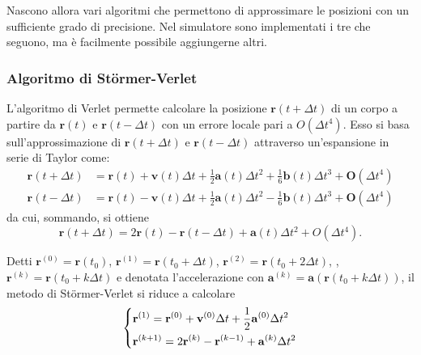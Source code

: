 \documentclass[11pt]{article}
\begin{document}
	Nascono allora vari algoritmi che permettono di approssimare le posizioni con un sufficiente grado di precisione. Nel simulatore sono implementati i tre che seguono, ma è facilmente possibile aggiungerne altri.

	\subsubsection{Algoritmo di Störmer-Verlet}

	L'algoritmo di Verlet\cite{VerletIntegration} permette calcolare la posizione $\mathbf{r}(t + \Delta t)$ di un corpo a partire da $\mathbf{r}(t)$ e $\mathbf{r}(t - \Delta t)$ con un errore locale pari a $O(\Delta t^4)$. Esso si basa sull'approssimazione di $\mathbf{r}(t + \Delta t)$ e $\mathbf{r}(t - \Delta t)$ attraverso un'espansione in serie di Taylor come:
	\begin{align}
		\mathbf{r}(t + \Delta t) &= \mathbf{r}(t) + \mathbf{v}(t)\Delta t + \frac{1}{2}\mathbf{a}(t)\Delta t^2 + \frac{1}{6}\mathbf{b}(t)\Delta t^3 + \mathbf{O}(\Delta t^4) \label{eq:verlet_a} \\
		\mathbf{r}(t - \Delta t) &= \mathbf{r}(t) - \mathbf{v}(t)\Delta t + \frac{1}{2}\mathbf{a}(t)\Delta t^2 - \frac{1}{6}\mathbf{b}(t)\Delta t^3 + \mathbf{O}(\Delta t^4) \label{eq:verlet_b}
	\end{align}
	da cui, sommando, si ottiene 
	\begin{equation*}
		\mathbf{r}(t + \Delta t) = 2\mathbf{r}(t) - \mathbf{r}(t - \Delta t) + \mathbf{a}(t)\Delta t^2 + O(\Delta t^4).
	\end{equation*}

	\begin{tcolorbox}[title=Algoritmo di Störmer-Verlet]
		Detti $\mathbf{r}^{(0)} = \mathbf{r}(t_0)$, $\mathbf{r}^{(1)} = \mathbf{r}(t_0 + \Delta t)$, $\mathbf{r}^{(2)} = \mathbf{r}(t_0 + 2\Delta t)$, \textellipsis, $\mathbf{r}^{(k)} = \mathbf{r}(t_0 + k\Delta t)$ e denotata l'accelerazione con $\mathbf{a}^{(k)} = \mathbf{a}(\mathbf{r}(t_0 + k\Delta t))$, il metodo di Störmer-Verlet si riduce a calcolare
		\begin{equation}
			\begin{dcases}
				\mathbf{r}^{(1)} = \mathbf{r}^{(0)} + \mathbf{v}^{(0)}\Delta t + \frac{1}{2}\mathbf{a}^{(0)}\Delta t^2 \\
				\mathbf{r}^{(k + 1)} = 2\mathbf{r}^{(k)} - \mathbf{r}^{(k - 1)} + \mathbf{a}^{(k)}\Delta t^2
			\end{dcases}
		\end{equation}
	\end{tcolorbox}
\end{document}
